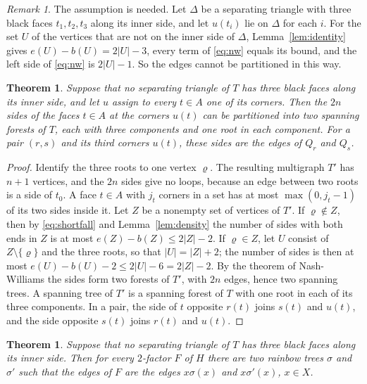 \documentclass[10pt]{amsart}
\numberwithin{equation}{section}
\newtheorem{theorem}[equation]{Theorem}
\theoremstyle{definition}
\theoremstyle{remark}
\newtheorem{remark}[equation]{Remark}
\begin{document}
\begin{remark}\label{rem:needed}
The assumption is needed.
Let $\Delta$ be a separating triangle with three black faces $t_1,t_2,t_3$ along its inner side, and let $u(t_i)$ lie on $\Delta$ for each $i$.
For the set $U$ of the vertices that are not on the inner side of $\Delta$, Lemma~\ref{lem:identity} gives $e(U)-b(U)=2|U|-3$, every term of \eqref{eq:nw} equals its bound, and the left side of \eqref{eq:nw} is $2|U|-1$.
So the edges cannot be partitioned in this way.
\end{remark}

\begin{theorem}\label{thm:twoforests}
Suppose that no separating triangle of $T$ has three black faces along its inner side, and let $u$ assign to every $t\in A$ one of its corners.
Then the $2n$ sides of the faces $t\in A$ at the corners $u(t)$ can be partitioned into two spanning forests of $T$, each with three components and one root in each component.
For a pair $(r,s)$ and its third corners $u(t)$, these sides are the edges of $Q_r$ and $Q_s$.
\end{theorem}

\begin{proof}
Identify the three roots to one vertex $\varrho$.
The resulting multigraph $T'$ has $n+1$ vertices, and the $2n$ sides give no loops, because an edge between two roots is a side of $t_0$.
A face $t\in A$ with $j_t$ corners in a set has at most $\max(0,j_t-1)$ of its two sides inside it.
Let $Z$ be a nonempty set of vertices of $T'$.
If $\varrho\notin Z$, then by \eqref{eq:shortfall} and Lemma~\ref{lem:density} the number of sides with both ends in $Z$ is at most $e(Z)-b(Z)\le2|Z|-2$.
If $\varrho\in Z$, let $U$ consist of $Z\setminus\{\varrho\}$ and the three roots, so that $|U|=|Z|+2$; the number of sides is then at most $e(U)-b(U)-2\le2|U|-6=2|Z|-2$.
By the theorem of Nash-Williams the sides form two forests of $T'$, with $2n$ edges, hence two spanning trees.
A spanning tree of $T'$ is a spanning forest of $T$ with one root in each of its three components.
In a pair, the side of $t$ opposite $r(t)$ joins $s(t)$ and $u(t)$, and the side opposite $s(t)$ joins $r(t)$ and $u(t)$.
\end{proof}

\begin{theorem}\label{thm:edmonds}
Suppose that no separating triangle of $T$ has three black faces along its inner side.
Then for every $2$-factor $F$ of $H$ there are two rainbow trees $\sigma$ and $\sigma'$ such that the edges of $F$ are the edges $x\sigma(x)$ and $x\sigma'(x)$, $x\in X$.
\end{theorem}
\end{document}
